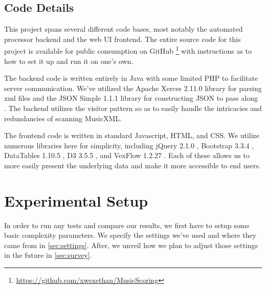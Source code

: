 \documentclass[10pt,preprint]{sigplanconf}
\begin{document}
{%

\subsection{Code Details} 
\label{sec:details}

This project spans several different code bases, most notably the automated processor backend and the web UI frontend. The entire source code for this project is available for public consumption on GitHub \footnote{\url{https://github.com/xwsxethan/MusicScoring}} \cite{GithubMusicScoring} with instructions as to how to set it up and run it on one's own.

The backend code is written entirely in Java with some limited PHP to facilitate server communication. We've utilized the Apache Xerces 2.11.0 library for parsing xml files \cite{XMLAPI} and the JSON Simple 1.1.1 library for constructing JSON to pass along \cite{JSONAPI}. The backend utilizes the visitor pattern so as to easily handle the intricacies and redundancies of scanning MusicXML.

The frontend code is written in standard Javascript, HTML, and CSS. We utilize numerous libraries here for simplicity, including jQuery 2.1.0 \cite{jQuery}, Bootstrap 3.3.4 \cite{Bootstrap}, DataTables 1.10.5 \cite{DataTables}, D3 3.5.5 \cite{D3}, and VexFlow 1.2.27 \cite{VexFlow}. Each of these allows us to more easily present the underlying data and make it more accessible to end users.


\section{Experimental Setup} 
\label{sec:experiment}

In order to run any tests and compare our results, we first have to setup some basic complexity parameters. We specify the settings we've used and where they came from in \ref{sec:settings}. After, we unveil how we plan to adjust those settings in the future in \ref{sec:survey}.


}
\end{document}
